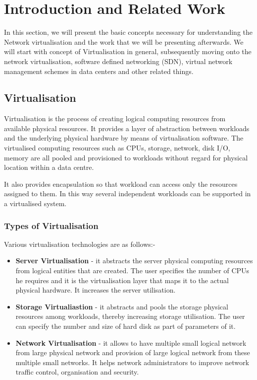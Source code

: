 \chapter{Introduction and Related Work}


In this section, we will present the basic concepts necessary for understanding the Network virtualisation and the work that we will be presenting afterwards. We will start with concept of Virtualisation in general, subsequently moving onto the network virtualisation, software defined networking (SDN), virtual network management schemes in data centers and other related things.

\section{Virtualisation}
Virtualisation is the process of creating logical computing resources from available physical resources. It provides a layer of abstraction between workloads and the underlying physical hardware by means of virtualisation software. The virtualised computing resources such as CPUs, storage, network, disk I/O, memory are all pooled and provisioned to workloads without regard for physical location within a data centre.

It also provides encapsulation so that workload can access only the resources assigned to them. In this way several independent workloads can be supported in a virtualised system.

\subsection{Types of Virtualisation}
Various virtualisation technologies are as follows:-

\begin{itemize}
    \item \textbf{Server Virtualisation} - it abstracts the server physical computing resources from logical entities that are created. The user specifies the number of CPUs he requires and it is the virtualisation layer that maps it to the actual physical hardware. It increases the server utilisation.
    \item \textbf{Storage Virtualiastion} - it abstracts and pools the storage physical resources among workloads, thereby increasing storage utilisation. The user can specify the number and size of hard disk as part of parameters of it.
    \item \textbf{Network Virtualisation} - it allows to have multiple small logical network from large physical network and provision of large logical network from these multiple small networks. It helps network administrators to improve network traffic control, organisation and security.
\end{itemize}

